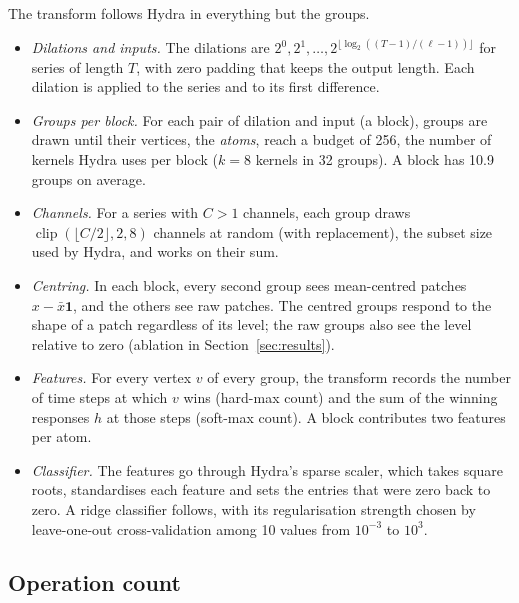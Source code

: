 The transform follows Hydra \citep{dempster2023hydra} in everything but the groups.
\begin{itemize}
\item \emph{Dilations and inputs.} The dilations are $2^0,2^1,\dots,
  2^{\lfloor\log_2((T-1)/(\ell-1))\rfloor}$ for series of length $T$, with zero padding
  that keeps the output length. Each dilation is applied to the series and to its first
  difference.
\item \emph{Groups per block.} For each pair of dilation and input (a block), groups are
  drawn until their vertices, the \emph{atoms}, reach a budget of 256, the number of
  kernels Hydra uses per block ($k=8$ kernels in 32 groups). A block has 10.9 groups on
  average.
\item \emph{Channels.} For a series with $C>1$ channels, each group draws
  $\operatorname{clip}(\lfloor C/2\rfloor,2,8)$ channels at random (with replacement), the
  subset size used by Hydra, and works on their sum.
\item \emph{Centring.} In each block, every second group sees mean-centred patches
  $x-\bar{x}\mathbf{1}$, and the others see raw patches. The centred groups respond to the
  shape of a patch regardless of its level; the raw groups also see the level relative to
  zero (ablation in Section~\ref{sec:results}).
\item \emph{Features.} For every vertex $v$ of every group, the transform records the
  number of time steps at which $v$ wins (hard-max count) and the sum of the winning
  responses $h$ at those steps (soft-max count). A block contributes two features per
  atom.
\item \emph{Classifier.} The features go through Hydra's sparse scaler, which takes square
  roots, standardises each feature and sets the entries that were zero back to zero. A
  ridge classifier follows, with its regularisation strength chosen by leave-one-out
  cross-validation among 10 values from $10^{-3}$ to $10^{3}$.
\end{itemize}

\subsection{Operation count}
\label{sec:operations}

\begin{table}[t]
\centering\small

\caption{Arithmetic per time step of one block (one dilation and input, 256 atoms), under
the frozen sampler. Operations are additions, subtractions, comparisons and, for Hydra,
multiplications; \hh{} also takes $\ell=9$ absolute values per group, included in its
count. The matched control has the same vertex sparsity as \hh{}. As timed, it evaluates
every vertex as a dense dot product over all $\ell$ taps, multiplying by $-1$, $0$ or $1$;
the sparse row counts an evaluation over the non-zeros only, which we did not implement.
Hydra finds both the maximum and the minimum of each group. Patch extraction, channel
sums, centring and counting are shared by all arms and not counted.}
\label{tab:operations}
\end{table}

